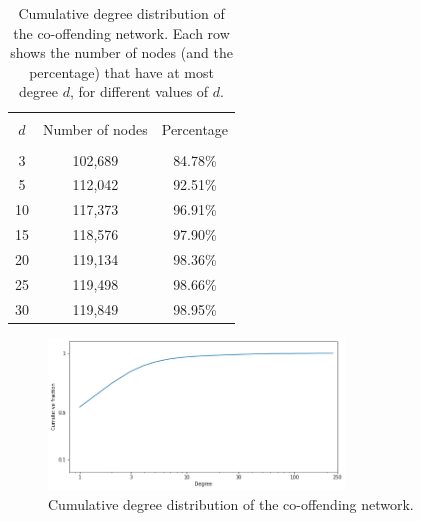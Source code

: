\documentclass[11pt, english]{article}
\begin{document}
\begin{multicols}{2}
\begin{table}
	\caption{Cumulative degree distribution of the co-offending network. Each row shows the number of nodes (and the percentage) that have at most degree $d$, for different values of $d$.}
	\label{tab:cumulative-degree-distribution}
	\centering
	\begin{tabular}{ccc}
		\hline\hline
		\\[-1.5ex]
		$d$		&	Number of nodes	&	Percentage	\\[0.5ex]\hline
		\\[-1.5ex]
		3		&	102,689			&	84.78\%		\\[0.2ex]
		5		&	112,042			&	92.51\%		\\[0.2ex]
		10		&	117,373			&	96.91\%		\\[0.2ex]
		15		&	118,576			&	97.90\%		\\[0.2ex]
		20		&	119,134			&	98.36\%		\\[0.2ex]
		25		&	119,498			&	98.66\%		\\[0.2ex]
		30		&	119,849			&	98.95\%		\\[0.5ex]
		\hline\hline
	\end{tabular}
\end{table}

\begin{figure}
	\caption{Cumulative degree distribution of the co-offending network.}
	\centering
	\label{fig:cumulative-degree-distribution}
	\includegraphics[width=0.7\textwidth]{cumulative-degree-distribution}
\end{figure}

\end{multicols}
\end{document}
